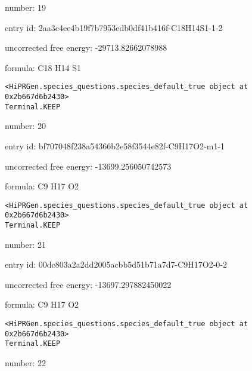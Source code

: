 \documentclass{article}
\begin{document}
number: 19



entry id: 2aa3c4ee4b19f7b7953edb0df41b416f-C18H14S1-1-2



uncorrected free energy: -29713.82662078988



formula: C18 H14 S1


\vspace{1cm}
\begin{verbatim}
<HiPRGen.species_questions.species_default_true object at 0x2b667d6b2430>
Terminal.KEEP
\end{verbatim}


number: 20



entry id: bf707048f238a54366b2e58f3544e82f-C9H17O2-m1-1



uncorrected free energy: -13699.256050742573



formula: C9 H17 O2


\vspace{1cm}
\begin{verbatim}
<HiPRGen.species_questions.species_default_true object at 0x2b667d6b2430>
Terminal.KEEP
\end{verbatim}


number: 21



entry id: 00dc803a2a2dd2005acbb5d51b71a7d7-C9H17O2-0-2



uncorrected free energy: -13697.297882450022



formula: C9 H17 O2


\vspace{1cm}
\begin{verbatim}
<HiPRGen.species_questions.species_default_true object at 0x2b667d6b2430>
Terminal.KEEP
\end{verbatim}


number: 22
\end{document}
